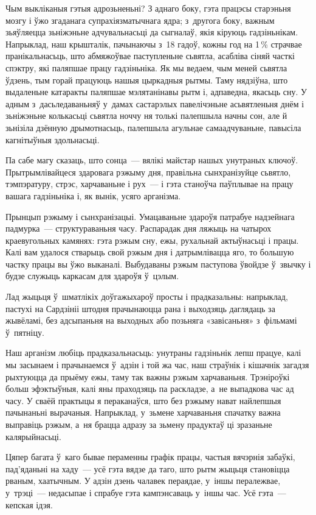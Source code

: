 Чым выкліканыя гэтыя адрозьненьні? З аднаго боку, гэта працэсы старэньня мозгу і ўжо згаданага супрахіязматычнага ядра; з~другога боку, важным зьяўляецца зьніжэньне адчувальнасьці да сыгналаў, якія кіруюць гадзіньнікам. Напрыклад, наш крышталік, пачынаючы з~18 гадоў, кожны год на 1\,\% страчвае пранікальнасьць, што абмяжоўвае паступленьне сьвятла, асабліва сіняй часткі спэктру, які паляпшае працу гадзіньніка. Як мы ведаем, чым меней сьвятла ўдзень, тым горай працуюць нашыя цыркадныя рытмы. Таму нядзіўна, што выдаленьне катаракты паляпшае мэлятанінавы рытм і, адпаведна, якасьць сну. У адным з~дасьледаваньняў у~дамах састарэлых павелічэньне асьвятленьня днём і зьніжэньне колькасьці сьвятла ноччу ня толькі палепшыла начны сон, але й зьнізіла дзённую дрымотнасьць, палепшыла агульнае самаадчуваньне, павысіла кагнітыўныя здольнасьці.

Па сабе магу сказаць, што сонца~--- вялікі майстар нашых унутраных ключоў. Прытрымлівайцеся здаровага рэжыму дня, правільна сынхранізуйце сьвятло, тэмпэратуру, стрэс, харчаваньне і рух~--- і гэта станоўча паўплывае на працу вашага гадзіньніка і, як вынік, усяго арганізма.

Прынцып рэжыму і сынхранізацыі. Умацаваньне здароўя патрабуе надзейнага падмурка~--- структураваньня часу. Распарадак дня ляжыць на чатырох краевугольных камянях: гэта рэжым сну, ежы, рухальнай актыўнасьці і працы. Калі вам удалося стварыць свой рэжым дня і датрымлівацца яго, то большую частку працы вы ўжо выканалі. Выбудаваны рэжым паступова ўвойдзе ў~звычку і будзе служыць каркасам для здароўя ў~цэлым.

Лад жыцьця ў~шматлікіх доўгажыхароў просты і прадказальны: напрыклад, пастухі на Сардзініі штодня прачынаюцца рана і выходзяць даглядаць за жывёламі, без адсыпаньня на выходных або позьняга «завісаньня» з~фільмамі ў~пятніцу.

Наш арганізм любіць прадказальнасьць: унутраны гадзіньнік лепш працуе, калі мы засынаем і прачынаемся ў~адзін і той жа час, наш страўнік і кішачнік загадзя рыхтуюцца да прыёму ежы, таму так важны рэжым харчаваньня. Трэніроўкі больш эфэктыўныя, калі яны праходзяць па раскладзе, а~не выпадкова час ад часу. У сваёй практыцы я пераканаўся, што без рэжыму нават найлепшыя пачынаньні вырачаныя. Напрыклад, у~зьмене харчаваньня спачатку важна выправіць рэжым, а~ня брацца адразу за зьмену прадуктаў ці зразаньне калярыйнасьці.

Цяпер багата ў~каго бывае пераменны графік працы, частыя вячэрнія забаўкі, пад'яданьні на хаду~--- усё гэта вядзе да таго, што рытм жыцьця становіцца рваным, хаатычным. У адзін дзень чалавек пераядае, у~іншы пералежвае, у~трэці~--- недасыпае і спрабуе гэта кампэнсаваць у~іншы час. Усё гэта~--- кепская ідэя. 

